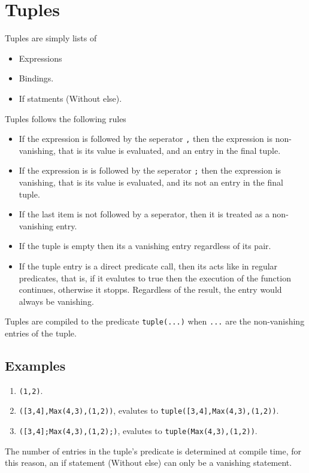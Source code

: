 \section{Tuples}

Tuples are simply lists of 
\begin{itemize}
    \item Expressions
    \item Bindings.
    \item If statments (Without else).
\end{itemize}

\noindent Tuples follows the following rules
\begin{itemize}
    \item If the expression is followed by the seperator \texttt{,} then the expression is 
        non-vanishing, that is its value is evaluated, and an entry in the final tuple.

    \item If the expression is is followed by the seperator \texttt{;} then the expression is 
        vanishing, that is its value is evaluated, and its not an entry in the final tuple.

    \item If the last item is not followed by a seperator, then it is treated as a non-vanishing entry. 

    \item If the tuple is empty then its a vanishing entry regardless of its pair.

    \item If the tuple entry is a direct predicate call, then its acts like in regular predicates, that is,
        if it evalutes to true then the execution of the function continues, otherwise it stopps. Regardless
        of the result, the entry would always be vanishing.
\end{itemize}

Tuples are compiled to the predicate \texttt{tuple(...)} when \texttt{...} are the non-vanishing
entries of the tuple.


\subsection{Examples}
\begin{enumerate}
    \item \texttt{(1,2)}.
    \item \texttt{([3,4],Max(4,3),(1,2))}, evalutes to \texttt{tuple([3,4],Max(4,3),(1,2))}.
    \item \texttt{([3,4];Max(4,3),(1,2);)}, evalutes to \texttt{tuple(Max(4,3),(1,2))}.
\end{enumerate}


\begin{note}
    The number of entries in the tuple's predicate is determined at compile time, for this reason,
    an if statement (Without else) can only be a vanishing statement.
\end{note}


